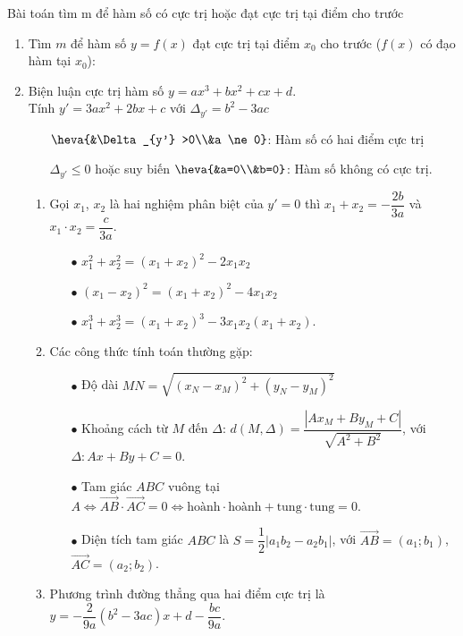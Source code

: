 \begin{dang}{Bài toán tìm m để hàm số có cực trị hoặc đạt cực trị tại điểm cho trước}
	\begin{enumerate}[\iconCV]
		\item Tìm $m$ để hàm số $y=f(x)$ đạt cực trị tại điểm $x_0$ cho trước ($f(x)$ có đạo hàm tại $x_0$):
	\item Biện luận cực trị hàm số $y=ax^3+bx^2+cx+d$.\\
	Tính $y'=3ax^2+2bx+c$ với $\Delta_{y'}=b^2-3ac$
	\begin{itemize}
		\item[\ding{172}] $\heva{&\Delta_{y'} >0\\&a \ne 0}$: Hàm số có hai điểm cực trị
		\item[\ding{173}]  $\Delta_{y'} \le 0$ hoặc suy biến $\heva{&a=0\\&b=0}$: Hàm số không có cực trị.
	\end{itemize}
		\begin{enumerate}[\iconMT]
				\item Gọi $x_1$, $x_2$ là hai nghiệm phân biệt của $y'=0$ thì $x_1+x_2=-\dfrac{2b}{3a}$ và $x_1\cdot x_2 =\dfrac{c}{3a}$.
			\begin{itemize}
				\item [$\bullet$] $x_1^2+x_2^2=(x_1+x_2)^2-2x_1 x_2$
				\item [$\bullet$] $(x_1-x_2)^2=(x_1+x_2)^2-4x_1 x_2$
				\item [$\bullet$] $x_1^3+x_2^3=(x_1+x_2)^3-3x_1x_2(x_1+x_2)$.
			\end{itemize}
			\item Các công thức tính toán thường gặp:
			\begin{itemize}
				\item [$\bullet$] Độ dài $MN=\sqrt{(x_N-x_M)^2+(y_N-y_M)^2}$
				\item [$\bullet$]  Khoảng cách từ $M$ đến $\Delta$: $d(M,\Delta)=\dfrac{|Ax_M+By_M+C|}{\sqrt{A^2+B^2}}$, với $\Delta \colon Ax+By+C=0$.
				\item [$\bullet$] Tam giác $ABC$ vuông tại $A \Leftrightarrow \overrightarrow{AB} \cdot \overrightarrow{AC}=0 \Leftrightarrow \text{hoành}\cdot\text{hoành}+\text{tung}\cdot\text{tung}=0$.
				\item [$\bullet$] Diện tích tam giác $ABC$ là  $S=\dfrac{1}{2}|a_1b_2-a_2b_1|$, với $\overrightarrow{AB}=(a_1;b_1)$, $\overrightarrow{AC}=(a_2;b_2)$.
			\end{itemize}
			\item Phương trình đường thẳng qua hai điểm cực trị là $y=-\dfrac{2}{9a}(b^2-3ac)x+d-\dfrac{bc}{9a}$.
		\end{enumerate}
	\end{enumerate}
\end{dang}
